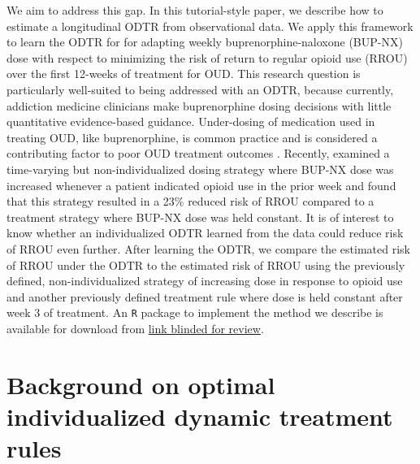 \documentclass[11pt]{article}
\begin{document}
We aim to address this gap. In this tutorial-style paper, we describe how to estimate a longitudinal ODTR from observational data. We apply this framework to learn the ODTR for %
for adapting weekly buprenorphine-naloxone (BUP-NX) dose with respect to minimizing the risk of return to regular opioid use (RROU) over the first 12-weeks of treatment for OUD. This research question is particularly well-suited to being addressed with an ODTR, because currently, addiction medicine clinicians make buprenorphine dosing decisions with little quantitative evidence-based guidance. Under-dosing of medication used in treating OUD, like buprenorphine, is common practice and is considered a contributing factor to poor OUD treatment outcomes \citep{gordon2015patterns,d2019evidence}. Recently, \citet{rudolph2022dose} examined a time-varying but non-individualized dosing strategy where BUP-NX dose was increased whenever a patient indicated opioid use in the prior week and found that this strategy resulted in a 23\% reduced risk of RROU compared to a treatment strategy where BUP-NX dose was held constant. It is of interest to know whether an individualized ODTR learned from the data could reduce risk of RROU even further. After learning the ODTR, we compare the estimated risk of RROU under the ODTR to the estimated risk of RROU using the previously defined, non-individualized strategy of increasing dose in response to opioid use%
\citep{rudolph2022dose} and another previously defined treatment rule where dose is held constant after week 3 of treatment. An \texttt{R} package to implement the method we describe is available for download from 
\url{link blinded for review}.


\section{Background on optimal individualized dynamic treatment rules}
\end{document}
